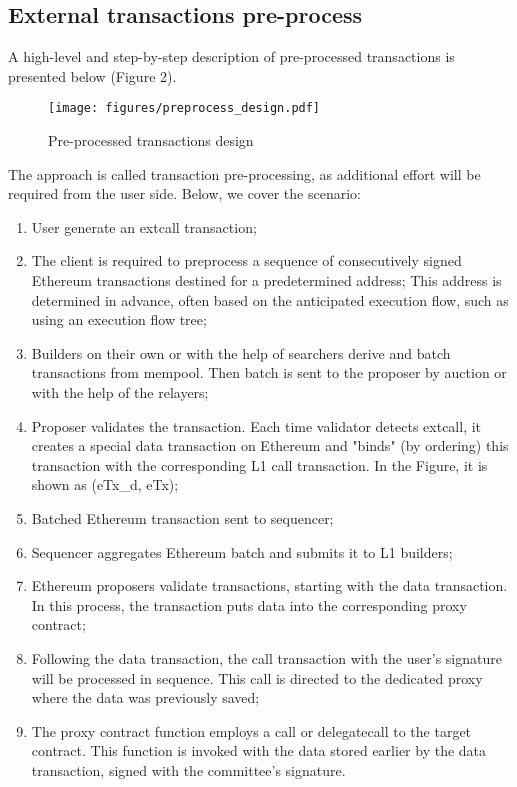 \subsection{External transactions pre-process}
A high-level and step-by-step description of pre-processed transactions is presented below 
(Figure 2).

\begin{figure}[H]
    \centering
	\texttt{[image: figures/preprocess\_design.pdf]}
    \caption{Pre-processed transactions design}
     \label{figure:staking-market}
\end{figure}

The approach is called transaction pre-processing, as additional effort will be required from 
the user side. Below, we cover the scenario:
\begin{enumerate}
    \item User generate an extcall transaction;
    \item The client is required to preprocess a sequence of consecutively signed Ethereum 
    transactions destined for a predetermined address;
    This address is determined in advance, often based on the anticipated execution flow, 
    such as using an execution flow tree;
    \item Builders on their own or with the help of searchers derive and batch transactions 
    from mempool. Then batch is sent to the proposer by auction or with the help of the relayers;
    \item Proposer validates the transaction. Each time validator detects extcall, it creates a 
    special data transaction on Ethereum and "binds" (by ordering) this transaction with the 
    corresponding L1 call transaction. In the Figure, it is shown as (eTx\_d, eTx);
    \item Batched Ethereum transaction sent to sequencer;
    \item Sequencer aggregates Ethereum batch and submits it to L1 builders;
    \item Ethereum proposers validate transactions, starting with the data transaction. 
    In this process, the transaction puts data into the corresponding proxy contract;
    \item Following the data transaction, the call transaction with the user's signature will be 
    processed in sequence. This call is directed to the dedicated proxy where the data was 
    previously saved;
    \item The proxy contract function employs a call or delegatecall to the target contract.
    This function is invoked with the data stored earlier by the data transaction, signed with 
    the committee's signature.
\end{enumerate}


